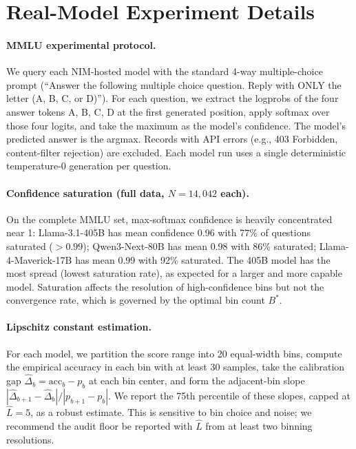 \documentclass{article}
\newcommand{\Lip}{L}
\newcommand{\calmap}{\Delta}
\theoremstyle{definition}
\begin{document}
\section{Real-Model Experiment Details}
\label{app:real-model}

\paragraph{MMLU experimental protocol.} We query each NIM-hosted model with the standard 4-way multiple-choice prompt (``Answer the following multiple choice question. Reply with ONLY the letter (A, B, C, or D)''). For each question, we extract the logprobs of the four answer tokens A, B, C, D at the first generated position, apply softmax over those four logits, and take the maximum as the model's confidence. The model's predicted answer is the argmax. Records with API errors (e.g., 403 Forbidden, content-filter rejection) are excluded. Each model run uses a single deterministic temperature-0 generation per question.

\paragraph{Confidence saturation (full data, $N = 14{,}042$ each).} On the complete MMLU set, max-softmax confidence is heavily concentrated near 1: Llama-3.1-405B has mean confidence 0.96 with 77\% of questions saturated ($> 0.99$); Qwen3-Next-80B has mean 0.98 with 86\% saturated; Llama-4-Maverick-17B has mean 0.99 with 92\% saturated. The 405B model has the most spread (lowest saturation rate), as expected for a larger and more capable model. Saturation affects the resolution of high-confidence bins but not the convergence rate, which is governed by the optimal bin count $B^*$.

\paragraph{Lipschitz constant estimation.} For each model, we partition the score range into 20 equal-width bins, compute the empirical accuracy in each bin with at least 30 samples, take the calibration gap $\hat\calmap_b = \mathrm{acc}_b - p_b$ at each bin center, and form the adjacent-bin slope $|\hat\calmap_{b+1} - \hat\calmap_b|/|p_{b+1} - p_b|$. We report the 75th percentile of these slopes, capped at $\hat\Lip = 5$, as a robust estimate. This is sensitive to bin choice and noise; we recommend the audit floor be reported with $\hat\Lip$ from at least two binning resolutions.
\end{document}
